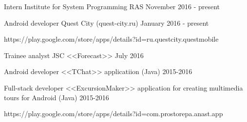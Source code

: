 


\begin{cventries}


\cventry
{Intern} %
{Institute for System Programming RAS} %
{} %
{November 2016 - present} %
{ %
}


\cventry
{Android developer} %
{Quest City (quest-city.ru)} %
{} %
{January 2016 - present} %
{ %
  \begin{cvitems}
\item {https://play.google.com/store/apps/details?id=ru.questcity.questmobile}
 \end{cvitems}
}


\cventry
{Trainee analyst } %
{JSC <<Forecast>>} %
{} %
{July 2016} %
{ %
}


\cventry
{Android developer} %
{<<TChat>> applicatiion (Java)} %
{} %
{2015-2016} %
{ %
}


\cventry
{Full-stack developer} %
{<<ExcursionMaker>> application for creating multimedia tours for Android  (Java) } %
{} %
{2015-2016} %
{ %
 \begin{cvitems}
\item {https://play.google.com/store/apps/details?id=com.prostorepa.anast.app}
 \end{cvitems}
}


\end{cventries}
